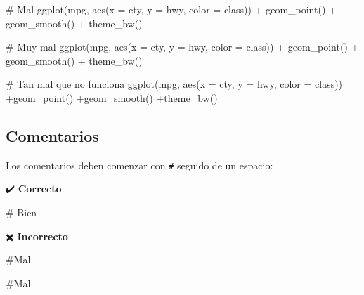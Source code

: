 \documentclass[
  spanish,
  letterpaper,
  DIV=11,
  numbers=noendperiod]{scrreprt}
\newenvironment{Shaded}{\begin{snugshade}}{\end{snugshade}}
\newcommand{\AttributeTok}[1]{\textcolor[rgb]{0.40,0.45,0.13}{#1}}
\newcommand{\CommentTok}[1]{\textcolor[rgb]{0.37,0.37,0.37}{#1}}
\newcommand{\FunctionTok}[1]{\textcolor[rgb]{0.28,0.35,0.67}{#1}}
\newcommand{\NormalTok}[1]{\textcolor[rgb]{0.00,0.23,0.31}{#1}}
\newcommand{\SpecialCharTok}[1]{\textcolor[rgb]{0.37,0.37,0.37}{#1}}
\begin{document}
\begin{Shaded}
\begin{Highlighting}[]
\CommentTok{\# Mal}
\FunctionTok{ggplot}\NormalTok{(mpg, }\FunctionTok{aes}\NormalTok{(}\AttributeTok{x =}\NormalTok{ cty, }\AttributeTok{y =}\NormalTok{ hwy, }\AttributeTok{color =}\NormalTok{ class)) }\SpecialCharTok{+}
  \FunctionTok{geom\_point}\NormalTok{() }\SpecialCharTok{+}
  \FunctionTok{geom\_smooth}\NormalTok{() }\SpecialCharTok{+}
  \FunctionTok{theme\_bw}\NormalTok{()}

\CommentTok{\# Muy mal}
\FunctionTok{ggplot}\NormalTok{(mpg, }\FunctionTok{aes}\NormalTok{(}\AttributeTok{x =}\NormalTok{ cty, }\AttributeTok{y =}\NormalTok{ hwy, }\AttributeTok{color =}\NormalTok{ class)) }\SpecialCharTok{+}
  \FunctionTok{geom\_point}\NormalTok{() }\SpecialCharTok{+}
  \FunctionTok{geom\_smooth}\NormalTok{() }\SpecialCharTok{+}
  \FunctionTok{theme\_bw}\NormalTok{()}

\CommentTok{\# Tan mal que no funciona}
\FunctionTok{ggplot}\NormalTok{(mpg, }\FunctionTok{aes}\NormalTok{(}\AttributeTok{x =}\NormalTok{ cty, }\AttributeTok{y =}\NormalTok{ hwy, }\AttributeTok{color =}\NormalTok{ class))}
\SpecialCharTok{+}\FunctionTok{geom\_point}\NormalTok{()}
\SpecialCharTok{+}\FunctionTok{geom\_smooth}\NormalTok{()}
\SpecialCharTok{+}\FunctionTok{theme\_bw}\NormalTok{()}
\end{Highlighting}
\end{Shaded}

\subsection{Comentarios}\label{comentarios}

Los comentarios deben comenzar con \texttt{\#} seguido de un espacio:

✔️ \textbf{Correcto}

\begin{Shaded}
\begin{Highlighting}[]
\CommentTok{\# Bien}
\end{Highlighting}
\end{Shaded}

✖️ \textbf{Incorrecto}

\begin{Shaded}
\begin{Highlighting}[]
\CommentTok{\#Mal}

\CommentTok{\#Mal}
\end{Highlighting}
\end{Shaded}
\end{document}
